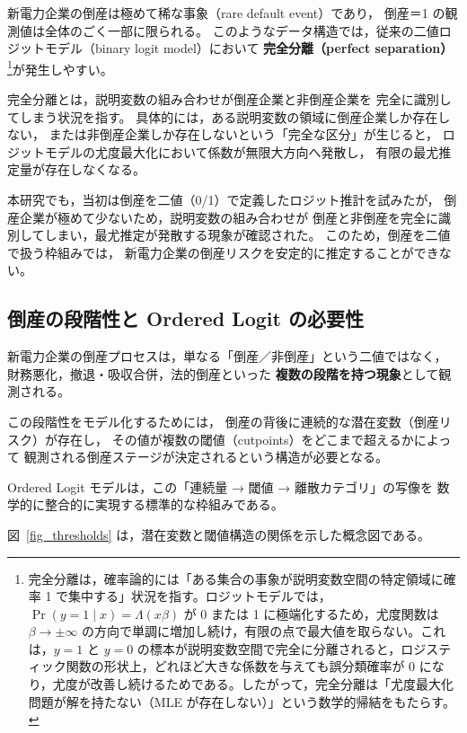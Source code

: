 新電力企業の倒産は極めて稀な事象（rare default event）であり，
倒産＝1 の観測値は全体のごく一部に限られる。
このようなデータ構造では，従来の二値ロジットモデル（binary logit model）において
\textbf{完全分離（perfect separation）} \footnote{
完全分離は，確率論的には「ある集合の事象が説明変数空間の特定領域に確率 1 で集中する」状況を指す。ロジットモデルでは，$\Pr(y=1\mid x)=\Lambda(x\beta)$ が 0 または 1 に極端化するため，尤度関数は $\beta\to\pm\infty$ の方向で単調に増加し続け，有限の点で最大値を取らない。これは，$y=1$ と $y=0$ の標本が説明変数空間で完全に分離されると，ロジスティック関数の形状上，どれほど大きな係数を与えても誤分類確率が 0 になり，尤度が改善し続けるためである。したがって，完全分離は「尤度最大化問題が解を持たない（MLE が存在しない）」という数学的帰結をもたらす。
}が発生しやすい。

完全分離とは，説明変数の組み合わせが倒産企業と非倒産企業を
完全に識別してしまう状況を指す。
具体的には，ある説明変数の領域に倒産企業しか存在しない，
または非倒産企業しか存在しないという「完全な区分」が生じると，
ロジットモデルの尤度最大化において係数が無限大方向へ発散し，
有限の最尤推定量が存在しなくなる。

本研究でも，当初は倒産を二値（0/1）で定義したロジット推計を試みたが，
倒産企業が極めて少ないため，説明変数の組み合わせが
倒産と非倒産を完全に識別してしまい，最尤推定が発散する現象が確認された。
このため，倒産を二値で扱う枠組みでは，
新電力企業の倒産リスクを安定的に推定することができない。

\subsection{倒産の段階性と Ordered Logit の必要性}

新電力企業の倒産プロセスは，単なる「倒産／非倒産」という二値ではなく，
財務悪化，撤退・吸収合併，法的倒産といった
\textbf{複数の段階を持つ現象}として観測される。

この段階性をモデル化するためには，
倒産の背後に連続的な潜在変数（倒産リスク）が存在し，
その値が複数の閾値（cutpoints）をどこまで超えるかによって
観測される倒産ステージが決定されるという構造が必要となる。

Ordered Logit モデルは，この「連続量 → 閾値 → 離散カテゴリ」の写像を
数学的に整合的に実現する標準的な枠組みである。

図~\ref{fig_thresholds} は，潜在変数と閾値構造の関係を示した概念図である。

